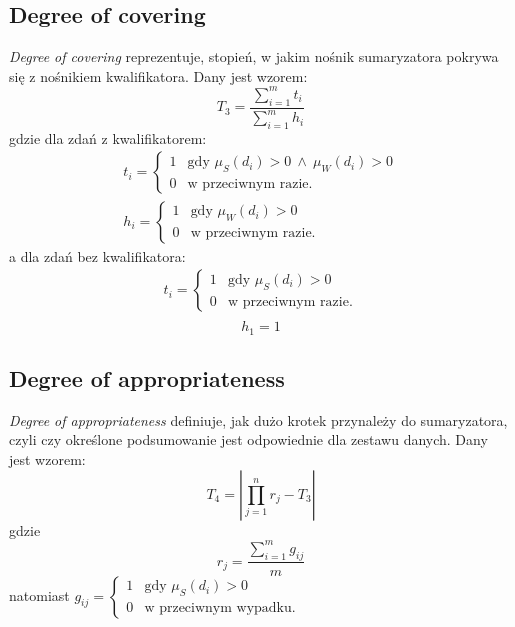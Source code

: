 \documentclass{classrep}
\begin{document}
	\subsection{Degree of covering}
\textsl{Degree of covering} reprezentuje, stopień, w jakim nośnik sumaryzatora pokrywa się z nośnikiem kwalifikatora. Dany jest wzorem:
	\begin{equation}
T_3 = \frac{\sum_{i=1}^{m}t_i}{\sum_{i=1}^{m}h_i}
	\end{equation}
gdzie dla zdań z kwalifikatorem:
\[
\begin{array}{l}
t_i = \begin{cases}
1 & \mbox{gdy } \mu_{S}(d_i) > 0 ~ \wedge ~ \mu_{W}(d_i) > 0 \\
0 & \mbox{w przeciwnym razie.}
\end{cases} \\
h_i = \begin{cases}
1 & \mbox{gdy } \mu_{W}(d_i) > 0 \\
0 & \mbox{w przeciwnym razie.}
\end{cases}
\end{array}\]
a dla zdań bez kwalifikatora:
\[
\begin{array}{l}
t_i = \begin{cases}
1 & \mbox{gdy } \mu_{S}(d_i) > 0  \\
0 & \mbox{w przeciwnym razie.}
\end{cases} \\
\end{array}\]
\[h_1 = 1\]



	\subsection{Degree of appropriateness}
\textsl{Degree of appropriateness} definiuje, jak dużo krotek przynależy do sumaryzatora, czyli czy określone podsumowanie jest odpowiednie dla zestawu danych. Dany jest wzorem:
\begin{equation}
T_4 = \left| \prod_{j=1}^{n} r_j - T_3\right|
\end{equation}
gdzie
\begin{equation}
r_j = \frac{\sum_{i=1}^{m} g_{ij}}{m}
\end{equation}
natomiast
$
g_{ij} = \begin{cases}
1 & \mbox{gdy } \mu_{S}(d_i) > 0 \\
0 & \mbox{w przeciwnym wypadku.}
\end{cases}
$
\end{document}
